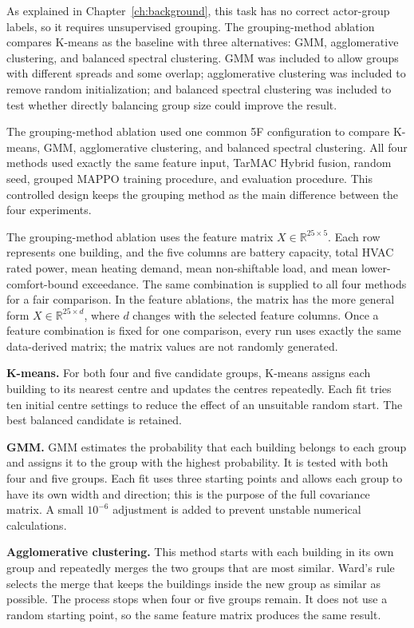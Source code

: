 As explained in Chapter~\ref{ch:background}, this task has no correct actor-group
labels, so it requires unsupervised grouping. The grouping-method ablation
compares K-means as the baseline with three alternatives: GMM, agglomerative
clustering, and balanced spectral clustering. GMM was included to allow groups
with different spreads and some overlap; agglomerative clustering was included
to remove random initialization; and balanced spectral clustering was included
to test whether directly balancing group size could improve the result.

The grouping-method ablation used one common 5F configuration to compare K-means,
GMM, agglomerative clustering, and balanced spectral clustering. All four methods
used exactly the same feature input, TarMAC Hybrid fusion, random seed, grouped
MAPPO training procedure, and evaluation procedure. This controlled design keeps
the grouping method as the main difference between the four experiments.

The grouping-method ablation uses the feature matrix
$X\in\mathbb{R}^{25\times5}$. Each row represents one building, and the five
columns are battery capacity, total HVAC rated power, mean heating demand, mean
non-shiftable load, and mean lower-comfort-bound exceedance. The same combination
is supplied to all four methods for a fair comparison. In the feature ablations, the matrix
has the more general form $X\in\mathbb{R}^{25\times d}$, where $d$ changes with
the selected feature columns. Once a feature combination is fixed for one
comparison, every run uses exactly the same data-derived matrix; the matrix
values are not randomly generated.

\noindent\textbf{K-means.}
For both four and five candidate groups, K-means assigns each building to its
nearest centre and updates the centres repeatedly. Each fit tries ten initial
centre settings to reduce the effect of an unsuitable random start. The best
balanced candidate is retained.

\noindent\textbf{GMM.}
GMM estimates the probability that each building belongs to each group and
assigns it to the group with the highest probability. It is tested with both four
and five groups. Each fit uses three starting points and allows each group to
have its own width and direction; this is the purpose of the full covariance
matrix. A small $10^{-6}$ adjustment is added to prevent unstable numerical
calculations.

\noindent\textbf{Agglomerative clustering.}
This method starts with each building in its own group and repeatedly merges the
two groups that are most similar. Ward's rule selects the merge that keeps the
buildings inside the new group as similar as possible. The process stops when
four or five groups remain. It does not use a random starting point, so the same
feature matrix produces the same result.


